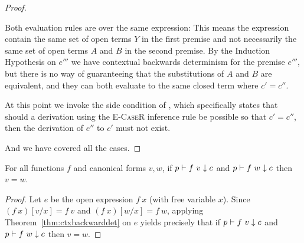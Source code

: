 \begin{proof}
\begin{itemize}
\begin{itemize}
        Both evaluation rules are over the same expression: This means the
        expression contain the same set of open terms $Y$ in the first premise
        and not necessarily the same set of open terms $A$ and $B$ in the
        second premise. By the Induction Hypothesis on $e'''$ we have
        contextual backwards determinism for the premise $e'''$, but there is
        no way of guaranteeing that the substitutions of $A$ and $B$ are
        equivalent, and they can both evaluate to the same closed term where
        $c' = c''$.

        At this point we invoke the side condition of , which
        specifically states that should a derivation using the \textsc{E-CaseR}
        inference rule be possible so that $c' = c''$, then the derivation of
        $e''$ to $c'$ must not exist.

    \end{itemize}

\end{itemize}

And we have covered all the cases.

\end{proof}

\begin{corollary}[Injectivity]
  For all functions $f$ and canonical forms $v,w$, if $p \vdash f~v \downarrow c$
  and $p \vdash f~w \downarrow c$ then $v = w$.
\end{corollary}

\begin{proof}
  Let $e$ be the open expression $f~x$ (with free variable $x$). Since
  $(f~x)[v/x] = f~v$ and $(f~x)[w/x] = f~w$, applying
  Theorem~\ref{thm:ctxbackwarddet} on $e$ yields precisely that if $p \vdash f~v
  \downarrow c$ and $p \vdash f~w \downarrow c$ then $v=w$.
\end{proof}

